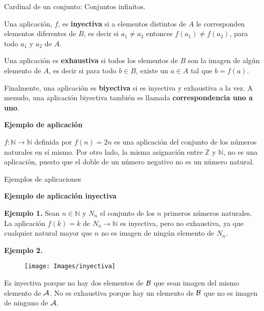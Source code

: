\documentclass[
  ignorenonframetext,
]{beamer}
\begin{document}
\begin{frame}{Cardinal de un conjunto: Conjuntos infinitos.}
\protect\hypertarget{cardinal-de-un-conjunto-conjuntos-infinitos.-1}{}

Una aplicación, \(f\), es \textbf{inyectiva} si a elementos distintos de
\(A\) le corresponden elementos diferentes de \(B\), es decir si
\(a_1 \neq a_2\) entonces \(f(a_1) \neq f(a_2)\), para todo \(a_1\) y
\(a_2\) de \(A\).

Una aplicación es \textbf{exhaustiva} si todos los elementos de \(B\)
son la imagen de algún elemento de \(A\), es decir si para todo
\(b \in B\), existe un \(a \in A\) tal que \(b=f(a)\).

Finalmente, una aplicación es \textbf{biyectiva} si es inyectiva y
exhaustiva a la vez. A menudo, una aplicación biyectiva también es
llamada \textbf{correspondencia uno a uno}.

\textbf{Ejemplo de aplicación}

\(f: \mathbb{N} \rightarrow \mathbb{N}\) definida por \(f(n) = 2n\) es
una aplicación del conjunto de los números naturales en sí mismo. Por
otro lado, la misma asignación entre \(\mathbb{Z}\) y \(\mathbb{N}\), no
es una aplicación, puesto que el doble de un número negativo no es un
número natural.

\end{frame}

\begin{frame}{Ejemplos de aplicaciones}
\protect\hypertarget{ejemplos-de-aplicaciones}{}

\textbf{Ejemplo de aplicación inyectiva}

\textbf{Ejemplo 1. }Sean \(n \in \mathbb{N}\) y \(N_n\) el conjunto de
los \(n\) primeros números naturales. La aplicación \(f(k)=k\) de
\(N_n \rightarrow \mathbb{N}\) es inyectiva, pero no exhaustiva, ya que
cualquier natural mayor que \(n\) no es imagen de ningún elemento de
\(N_n\).

\textbf{Ejemplo 2.}

\begin{figure}
\texttt{[image: Images/inyectiva]} \end{figure}

Es inyectiva porque no hay dos elementos de \(\cal{B}\) que sean imagen
del mismo elemento de \(\cal{A}\). No es exhaustiva porque hay un
elemento de \(\cal{B}\) que no es imagen de ninguno de \(\cal{A}\).

\end{frame}
\end{document}
